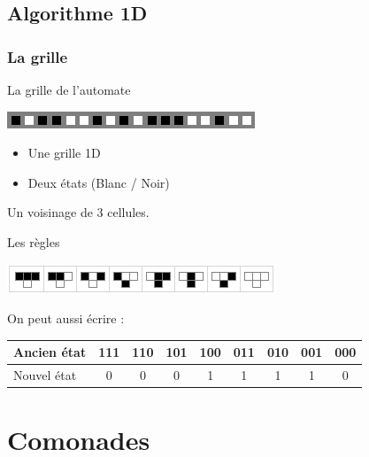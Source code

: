 \documentclass{beamer}
\begin{document}
\subsection{Algorithme 1D}
\begin{frame}
\frametitle{La grille}
\begin{block}{La grille de l'automate}
\begin{center}
\includegraphics[scale=0.5]{grid.png}
\end{center}
\end{block}
\begin{itemize}
	\item Une grille 1D
	\item Deux états (Blanc / Noir)
\end{itemize}
\end{frame}

\begin{frame}
\begin{block}{}
	Un voisinage de 3 cellules.
\end{block}
\pause
\begin{block}{Les règles}
	\begin{center}
	\includegraphics[scale=1]{rule30_rule.png}
	\end{center}
\end{block}
\pause
\begin{block}{On peut aussi écrire :}
	\begin{center}
	\begin{tabular}{|l|c|c|c|c|c|c|c|c|}
	\hline
	Ancien état & 111 & 110 & 101 & 100 & 011 & 010 & 001 & 000 \\
	\hline
	Nouvel état	& 0   & 0   & 0   & 1   & 1   & 1   & 1   & 0 \\
	\hline
	\end{tabular}
	\end{center}
\end{block}
\end{frame}

\section{Comonades}
\end{document}
